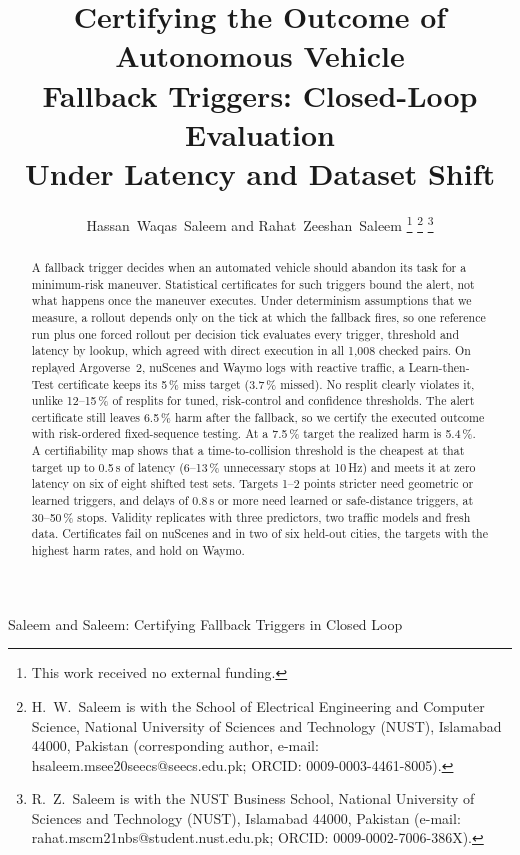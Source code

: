 \documentclass[lettersize,journal]{IEEEtran}
\begin{document}
\title{Certifying the Outcome of Autonomous Vehicle\\
Fallback Triggers: Closed-Loop Evaluation\\
Under Latency and Dataset Shift}

\author{Hassan~Waqas~Saleem and Rahat~Zeeshan~Saleem
\thanks{This work received no external funding.}%
\thanks{H.~W.~Saleem is with the School of Electrical Engineering and
Computer Science, National University of Sciences and Technology (NUST),
Islamabad 44000, Pakistan (corresponding author, e-mail:
hsaleem.msee20seecs@seecs.edu.pk; ORCID: 0009-0003-4461-8005).}%
\thanks{R.~Z.~Saleem is with the NUST Business School, National University
of Sciences and Technology (NUST), Islamabad 44000, Pakistan (e-mail:
rahat.mscm21nbs@student.nust.edu.pk; ORCID: 0009-0002-7006-386X).}}

%
{Saleem and Saleem: Certifying Fallback Triggers in Closed Loop}

\maketitle

\begin{abstract}
A fallback trigger decides when an automated vehicle should abandon its
task for a minimum-risk maneuver. Statistical certificates for such
triggers bound the alert, not what happens once the maneuver executes. Under
determinism assumptions that we measure, a rollout depends only on the tick
at which the fallback fires, so one reference run plus one forced rollout
per decision tick evaluates every trigger, threshold and latency by lookup,
which agreed with direct execution in all 1{,}008 checked pairs. On replayed
Argoverse~2, nuScenes and Waymo logs with reactive traffic, a Learn-then-Test
certificate keeps its 5\,\% miss target (3.7\,\% missed). No resplit clearly
violates it, unlike 12--15\,\% of resplits for tuned, risk-control and
confidence thresholds. The alert certificate still leaves 6.5\,\% harm after
the fallback, so we certify the executed outcome with risk-ordered
fixed-sequence testing. At a 7.5\,\% target the realized harm is 5.4\,\%. A
certifiability map shows that a time-to-collision threshold is the
cheapest at that target up to 0.5\,s of latency (6--13\,\% unnecessary stops
at 10\,Hz) and meets it at zero latency on six of eight shifted test sets.
Targets 1--2 points stricter need geometric or learned triggers, and delays of
0.8\,s or more need learned or safe-distance triggers, at 30--50\,\% stops.
Validity replicates with three predictors, two traffic models and fresh data.
Certificates fail on nuScenes and in two of six held-out cities, the targets
with the highest harm rates, and hold on Waymo.
\end{abstract}
\end{document}

